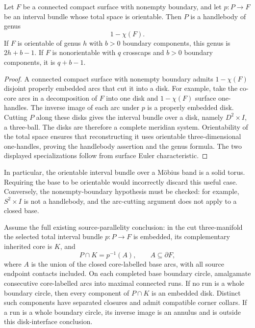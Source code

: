 \begin{lemma}
\label{geo:lem-ibundle}
Let $F$ be a connected compact surface with nonempty boundary, and let
$p:P\to F$ be an interval bundle whose total space is orientable.  Then
$P$ is a handlebody of genus
\[
 1-\chi(F).
 \tag{G6}\label{geo:eq-bundle-genus}
\]
If $F$ is orientable of genus $h$ with $b>0$ boundary components, this genus
is $2h+b-1$.  If $F$ is nonorientable with $q$ crosscaps and $b>0$ boundary
components, it is $q+b-1$.
\end{lemma}

\begin{proof}
A connected compact surface with nonempty boundary admits
$1-\chi(F)$ disjoint properly embedded arcs that cut it into a disk.  For
example, take the co-core arcs in a decomposition of $F$ into one disk and
$1-\chi(F)$ surface one-handles.  The inverse image of each arc under $p$
is a properly embedded disk.  Cutting $P$ along these disks gives the
interval bundle over a disk, namely $D^2\times I$, a three-ball.  The disks
are therefore a complete meridian system.  Orientability of the total
space ensures that reconstructing it uses orientable three-dimensional
one-handles, proving the handlebody assertion and the genus formula.  The
two displayed specializations follow from surface Euler characteristic.
\end{proof}

In particular, the orientable interval bundle over a M\"obius band is a
solid torus.  Requiring the base to be orientable would incorrectly discard
this useful case.  Conversely, the nonempty-boundary hypothesis must be
checked: for example, $S^2\times I$ is not a handlebody, and the arc-cutting
argument does not apply to a closed base.

\begin{lemma}
\label{geo:lem-interface}
Assume the full existing source-parallelity conclusion: in the cut
three-manifold the selected total interval bundle $p:P\to F$ is embedded,
its complementary inherited core is $K$, and
\[
 P\cap K=p^{-1}(A),
 \qquad A\subseteq\partial F,
 \tag{G7}\label{geo:eq-intersection}
\]
where $A$ is the union of the closed core-labelled base arcs, with all
source endpoint contacts included.  On each completed base boundary
circle, amalgamate consecutive core-labelled arcs into maximal connected
runs.  If no run is a whole boundary circle, then every component of
$P\cap K$ is an embedded disk.  Distinct such components have separated
closures and admit compatible corner collars.  If a run is a whole
boundary circle, its inverse image is an annulus and is outside this
disk-interface conclusion.
\end{lemma}

